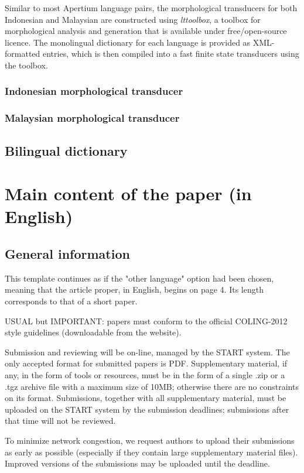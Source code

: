 \documentclass[10pt,a5paper,twoside]{article}
\begin{document}
Similar to most Apertium language pairs, the morphological transducers for both Indonesian and Malaysian are constructed using \emph{lttoolbox}, a toolbox for morphological analysis and generation that is available under free/open-source licence. The monolingual dictionary for each language is provided as XML-formatted entries, which is then compiled into a fast finite state transducers using the toolbox.
\subsubsection{Indonesian morphological transducer}
\subsubsection{Malaysian morphological transducer}
\subsection{Bilingual dictionary}

\section{Main content of the paper (in English)}
\subsection{General information}
This template continues as if the "other language" option had been chosen, meaning that the article proper, in English, begins on page 4. Its length corresponds to that of a short paper.

USUAL but IMPORTANT: papers must conform to the official COLING-2012 style guidelines (downloadable from the website).

Submission and reviewing will be on-line, managed by the START system. The only accepted format for submitted papers is PDF. Supplementary material, if any, in the form of tools or resources, must be in the form of a single .zip or a .tgz archive file with a maximum size of 10MB; otherwise there are no constraints on its format. Submissions, together with all supplementary material, must be uploaded on the START system by the submission deadlines; submissions after that time will not be reviewed.

To minimize network congestion, we request authors to upload their submissions as early as possible (especially if they contain large supplementary material files). Improved versions of the submissions may be uploaded until the deadline.
\end{document}
